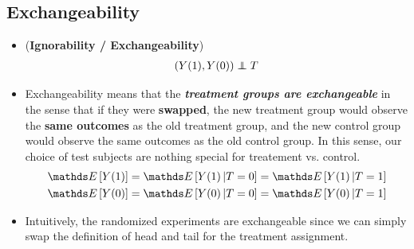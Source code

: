 \documentclass[11pt]{article}
\begin{document}
\subsection{Exchangeability}
\begin{itemize}
\item  \begin{assumption} (\textbf{Ignorability / Exchangeability}) \citep{neal2020introduction}
\begin{align}
(Y(1), Y(0)) \indep T  \label{eqn: Ignorability}
\end{align}
\end{assumption}

\item Exchangeability means that the \textbf{\emph{treatment groups are exchangeable}} in the sense that if they were \textbf{swapped}, the new treatment group would observe the \textbf{same outcomes} as the old treatment group, and the new control group would observe the same outcomes as the old control group. In this sense, our choice of test subjects are nothing special for treatement vs. control. 
\begin{align*}
\E{}{Y(1)} = \E{}{Y(1)\,| T = 0} &= \E{}{Y(1)\,| T = 1} \\
\E{}{Y(0)} = \E{}{Y(0)\,| T = 0} &= \E{}{Y(0)\,| T = 1}
\end{align*}

\item Intuitively, the randomized experiments are exchangeable since we can simply swap the definition of head and tail for the treatment assignment. 
\end{itemize}
\end{document}
